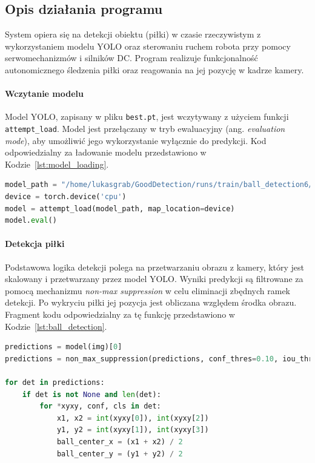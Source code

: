 \documentclass[a4paper,twoside,12pt]{book}
\begin{document}
\subsection{Opis działania programu}

System opiera się na detekcji obiektu (piłki) w czasie rzeczywistym z wykorzystaniem modelu YOLO oraz sterowaniu ruchem robota przy pomocy serwomechanizmów i silników DC. Program realizuje funkcjonalność autonomicznego śledzenia piłki oraz reagowania na jej pozycję w kadrze kamery.

\paragraph{Wczytanie modelu}
Model YOLO, zapisany w pliku \texttt{best.pt}, jest wczytywany z użyciem funkcji \texttt{attempt\_load}. Model jest przełączany w tryb ewaluacyjny (ang. \textit{evaluation mode}), aby umożliwić jego wykorzystanie wyłącznie do predykcji. Kod odpowiedzialny za ładowanie modelu przedstawiono w Kodzie~\ref{lst:model_loading}.

\begin{lstlisting}[language=Python, caption={Ładowanie modelu YOLO do pamięci.}, label={lst:model_loading}, captionpos=b]
model_path = "/home/lukasgrab/GoodDetection/runs/train/ball_detection6/weights/best.pt"
device = torch.device('cpu')
model = attempt_load(model_path, map_location=device)
model.eval()
\end{lstlisting}

\paragraph{Detekcja piłki}
Podstawowa logika detekcji polega na przetwarzaniu obrazu z kamery, który jest skalowany i przetwarzany przez model YOLO. Wyniki predykcji są filtrowane za pomocą mechanizmu \textit{non-max suppression} w celu eliminacji zbędnych ramek detekcji. Po wykryciu piłki jej pozycja jest obliczana względem środka obrazu. Fragment kodu odpowiedzialny za tę funkcję przedstawiono w Kodzie~\ref{lst:ball_detection}.

\begin{lstlisting}[language=Python, caption={Logika detekcji piłki przy użyciu modelu YOLO.}, label={lst:ball_detection}, captionpos=b]
predictions = model(img)[0]
predictions = non_max_suppression(predictions, conf_thres=0.10, iou_thres=0.45)

for det in predictions:
    if det is not None and len(det):
        for *xyxy, conf, cls in det:
            x1, x2 = int(xyxy[0]), int(xyxy[2])
            y1, y2 = int(xyxy[1]), int(xyxy[3])
            ball_center_x = (x1 + x2) / 2
            ball_center_y = (y1 + y2) / 2
\end{lstlisting}
\end{document}

